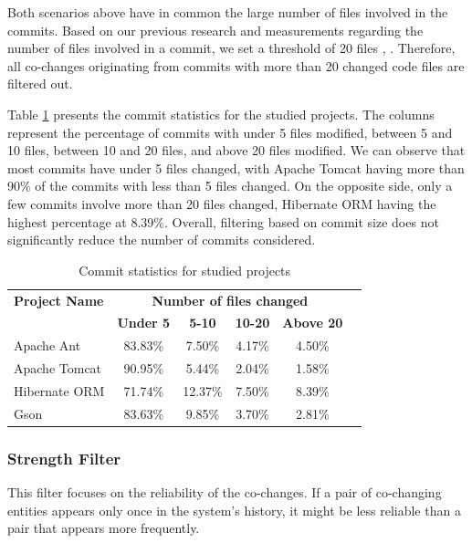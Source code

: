 \documentclass{ieeeaccess}
\begin{document}
Both scenarios above have in common the large number of files involved in the commits. Based on our previous research and measurements regarding the number of files involved in a commit, we set a threshold of 20 files \cite{b4}, \cite{b5}. Therefore, all co-changes originating from commits with more than 20 changed code files are filtered out.


Table \ref{tab:commit_statistics} presents the commit statistics for the studied projects. The columns represent the percentage of commits with under 5 files modified, between 5 and 10 files, between 10 and 20 files, and above 20 files modified. We can observe that most commits have under 5 files changed, with Apache Tomcat having more than 90\% of the commits with less than 5 files changed. On the opposite side, only a few commits involve more than 20 files changed, Hibernate ORM having the highest percentage at 8.39\%. Overall, filtering based on commit size does not significantly reduce the number of commits considered.

\begin{table}[ht]
    \centering
    \caption{Commit statistics for studied projects}
    \label{tab:commit_statistics}
    \begin{tabular}{|l|c|c|c|c|c|}
        \hline
	 \textbf{Project Name} & \multicolumn{4}{c|}{\textbf{{Number of files changed} }}  \\ 
	\cline{2-5}
         & \textbf{Under 5} & \textbf{5-10} & \textbf{10-20} & \textbf{Above 20} \\ \hline
        Apache Ant & 83.83\% & 7.50\% & 4.17\% & 4.50\% \\ 
        Apache Tomcat & 90.95\% & 5.44\% & 2.04\% & 1.58\%  \\ 
        Hibernate ORM & 71.74\% & 12.37\% & 7.50\% & 8.39\%  \\ 
        Gson & 83.63\% & 9.85\% & 3.70\% & 2.81\%  \\ \hline
    \end{tabular}
\end{table}


\subsubsection{Strength Filter}

This filter focuses on the reliability of the co-changes. If a pair of co-changing entities appears only once in the system's history, it might be less reliable than a pair that appears more frequently.
\end{document}
